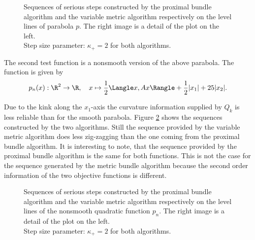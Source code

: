 \begin{figure}[H]
	\begin{subfigure}[t]{0.49\textwidth}
	\end{subfigure}
	\begin{subfigure}[t]{0.49\textwidth}
	\end{subfigure}
	\caption{Sequences of serious steps constructed by the proximal bundle algorithm and the variable metric algorithm respectively on the level lines of parabola \(p\). The right image is a detail of the plot on the left.\\
	Step size parameter: \(\kappa_+ = 2\) for both algorithms.}
	\label{fig_contour_parab}
\end{figure}

The second test function is a nonsmooth version of the above parabola. The function is given by 
\[ p_n(x): \R^2 \to \R, \quad x \mapsto \frac{1}{2}\Langle x, Ax \Rangle + \frac{1}{2}|x_1|+25|x_2|. \]

Due to the kink along the \(x_1\)-axis the curvature information supplied by \(Q_k\) is less reliable than for the smooth parabola.
Figure \ref{fig_contour_nonsm_parab} shows the sequences constructed by the two algorithms. Still the sequence provided by the variable metric algorithm does less zig-zagging than the one coming from the proximal bundle algorithm.
It is interesting to note, that the sequence provided by the proximal bundle algorithm is the same for both functions. This is not the case for the sequence generated by the metric bundle algorithm because the second order information of the two objective functions is different.

\begin{figure}[H]
	\begin{subfigure}[t]{0.49\textwidth}
	\end{subfigure}
	\begin{subfigure}[t]{0.49\textwidth}
	\end{subfigure}
	\caption{Sequences of serious steps constructed by the proximal bundle algorithm and the variable metric algorithm respectively on the level lines of the nonsmooth quadratic function \(p_n\). The right image is a detail of the plot on the left.\\
	Step size parameter: \(\kappa_+ = 2\) for both algorithms.}
	\label{fig_contour_nonsm_parab}
\end{figure}

